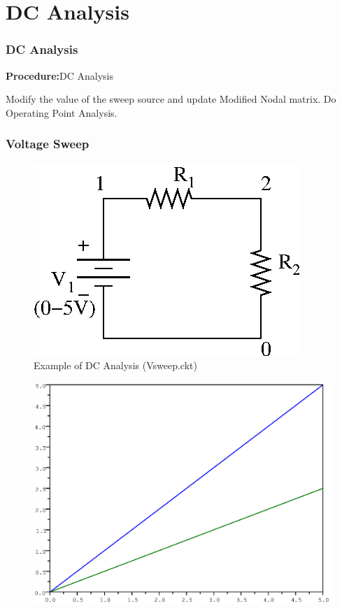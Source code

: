 \documentclass{beamer}
\begin{document}
\section{DC Analysis}
\begin{frame}
\frametitle{DC Analysis}
{\bf Procedure:}{DC Analysis}
\small
\begin{algorithmic}[1]
\STATE Modify the value of the sweep source and update Modified Nodal matrix.
\STATE Do Operating Point Analysis.
\end{algorithmic}
\normalsize
\end{frame}

\begin{frame}
\frametitle{Voltage Sweep}
\begin{minipage}[!b]{0.4\linewidth} %
\begin{figure}[h]
\centering
\includegraphics[scale=0.8]{../figures/V_Sweep.eps}
\caption{Example of DC Analysis (Vsweep.ckt)}
\end{figure}
\end{minipage}
\hspace{0.5cm} %
\begin{minipage}[!b]{0.5\linewidth} %
\begin{figure}[h]
\centering
\includegraphics[scale=0.3]{../figures/V_SweepOutput.eps}
\end{figure}
\end{minipage}
\end{frame}
\end{document}
